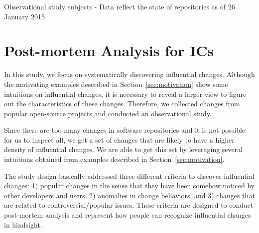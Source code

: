 \begin{landscape}
\begin{table}[t!]
    \caption{Observational study subjects - Data reflect the state of repositories as of 26 January 2015}
    \label{tab:subjects}
    
\end{table}
\end{landscape}

\section{Post-mortem Analysis for IC{\scriptsize s}}
\label{sec:preliminary}
In this study, we focus on systematically discovering influential
changes.  Although the motivating examples described in
Section~\ref{sec:motivation} show some intuitions on influential
changes, it is necessary to reveal a larger view to figure out the
characteristics of these changes. Therefore, we collected
\numChanges changes from
\numSubjects popular open-source projects and conducted an observational study.


Since there are too many changes in software repositories and it is not
possible for us to inspect all, we get a set of changes that are likely to
have a higher density of influential changes. We are able to get this set by
leveraging several intuitions obtained from examples described in
Section~\ref{sec:motivation}.

The study design basically addressed three different criteria to
discover influential changes: 1) popular changes in the sense that they
have been somehow noticed by other developers and users,
2) anomalies in change behaviors, and 3) changes that are related to controversial/popular issues. 
These criteria are designed to conduct post-mortem analysis and represent how people
can recognize influential changes in hindsight.

